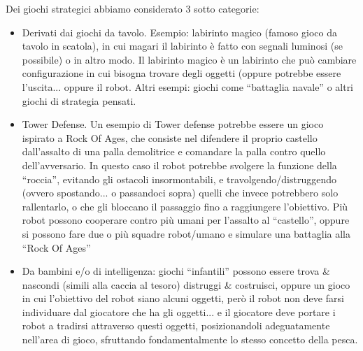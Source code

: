Dei giochi strategici abbiamo considerato 3 sotto categorie:
\begin{itemize}
\item Derivati dai giochi da tavolo. Esempio: labirinto magico (famoso gioco da tavolo in scatola), in cui magari il labirinto è fatto con segnali luminosi (se possibile) o in altro modo. Il labirinto magico è un labirinto che può cambiare configurazione in cui bisogna trovare degli oggetti (oppure potrebbe essere l’uscita... oppure il robot. Altri esempi: giochi come “battaglia navale” o altri giochi di strategia pensati.
\item Tower Defense. Un esempio di Tower defense potrebbe essere un gioco ispirato a Rock Of Ages, che consiste nel difendere il proprio castello dall’assalto di una palla demolitrice e comandare la palla contro quello dell’avversario. In questo caso il robot potrebbe svolgere la funzione della “roccia”, evitando gli ostacoli insormontabili, e travolgendo/distruggendo (ovvero spostando... o passandoci sopra) quelli che invece potrebbero solo rallentarlo, o che gli bloccano il passaggio fino a raggiungere l’obiettivo. Più robot possono cooperare contro più umani per l’assalto al “castello”, oppure si possono fare due o più squadre robot/umano e simulare una battaglia alla “Rock Of Ages”
\item Da bambini e/o di intelligenza: giochi “infantili” possono essere trova \& nascondi (simili alla caccia al tesoro) distruggi \& costruisci, oppure un gioco in cui l’obiettivo del robot siano alcuni oggetti, però il robot non deve farsi individuare dal giocatore che ha gli oggetti... e il giocatore deve portare i robot a tradirsi attraverso questi oggetti, posizionandoli adeguatamente nell’area di gioco, sfruttando fondamentalmente lo stesso concetto della pesca.
\end{itemize}

